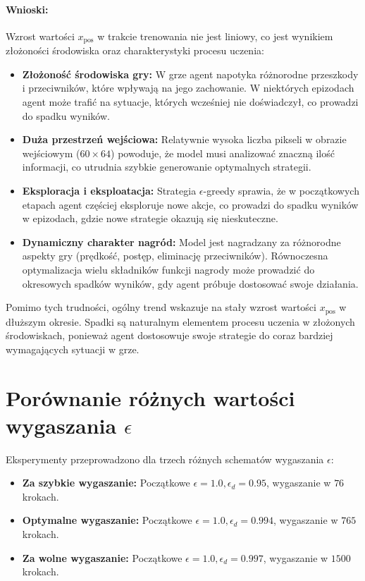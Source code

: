 \paragraph{Wnioski:}

Wzrost wartości \(x_{\text{pos}}\) w trakcie trenowania nie jest liniowy, co jest wynikiem złożoności środowiska oraz charakterystyki procesu uczenia:
\begin{itemize}
	\item \textbf{Złożoność środowiska gry:} W grze agent napotyka różnorodne przeszkody i przeciwników, które wpływają na jego zachowanie. W niektórych epizodach agent może trafić na sytuacje, których wcześniej nie doświadczył, co prowadzi do spadku wyników.
	\item \textbf{Duża przestrzeń wejściowa:} Relatywnie wysoka liczba pikseli w obrazie wejściowym (\(60 \times 64\)) powoduje, że model musi analizować znaczną ilość informacji, co utrudnia szybkie generowanie optymalnych strategii.
	\item \textbf{Eksploracja i eksploatacja:} Strategia \(\epsilon\)-greedy sprawia, że w początkowych etapach agent częściej eksploruje nowe akcje, co prowadzi do spadku wyników w epizodach, gdzie nowe strategie okazują się nieskuteczne.
	\item \textbf{Dynamiczny charakter nagród:} Model jest nagradzany za różnorodne aspekty gry (prędkość, postęp, eliminację przeciwników). Równoczesna optymalizacja wielu składników funkcji nagrody może prowadzić do okresowych spadków wyników, gdy agent próbuje dostosować swoje działania.
\end{itemize}

Pomimo tych trudności, ogólny trend wskazuje na stały wzrost wartości \(x_{\text{pos}}\) w dłuższym okresie. Spadki są naturalnym elementem procesu uczenia w złożonych środowiskach, ponieważ agent dostosowuje swoje strategie do coraz bardziej wymagających sytuacji w grze.

\section{Porównanie różnych wartości wygaszania \(\epsilon\)}

Eksperymenty przeprowadzono dla trzech różnych schematów wygaszania \(\epsilon\):
\begin{itemize}
	\item \textbf{Za szybkie wygaszanie:} Początkowe \(\epsilon = 1.0, \epsilon_d=0.95\), wygaszanie w \(76\) krokach.
	\item \textbf{Optymalne wygaszanie:} Początkowe \(\epsilon = 1.0, \epsilon_d=0.994\), wygaszanie w \(765\) krokach.
	\item \textbf{Za wolne wygaszanie:} Początkowe \(\epsilon = 1.0, \epsilon_d=0.997\), wygaszanie w \(1500\) krokach.
\end{itemize}

